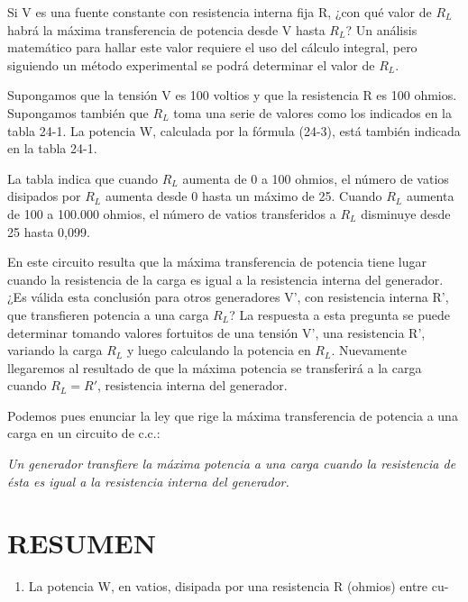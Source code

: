 \documentclass{article}
\begin{document}
Si V es una fuente constante con resistencia interna fija R, ¿con qué valor de $R_L$ habrá la máxima transferencia de potencia desde V hasta $R_L$? Un análisis matemático para hallar este valor requiere el uso del cálculo integral, pero siguiendo un método experimental se podrá determinar el valor de $R_L$.

Supongamos que la tensión V es 100 voltios y que la resistencia R es 100 ohmios. Supongamos también que $R_L$ toma una serie de valores como los indicados en la tabla 24-1. La potencia W, calculada por la fórmula (24-3), está también indicada en la tabla 24-1.

La tabla indica que cuando $R_L$ aumenta de 0 a 100 ohmios, el número de vatios disipados por $R_L$ aumenta desde 0 hasta un máximo de 25. Cuando $R_L$ aumenta de 100 a 100.000 ohmios, el número de vatios transferidos a $R_L$ disminuye desde 25 hasta 0,099.

En este circuito resulta que la máxima transferencia de potencia tiene lugar cuando la resistencia de la carga es igual a la resistencia interna del generador. ¿Es válida esta conclusión para otros generadores V', con resistencia interna R', que transfieren potencia a una carga $R_L$? La respuesta a esta pregunta se puede determinar tomando valores fortuitos de una tensión V', una resistencia R', variando la carga $R_L$ y luego calculando la potencia en $R_L$. Nuevamente llegaremos al resultado de que la máxima potencia se transferirá a la carga cuando $R_L = R'$, resistencia interna del generador.

Podemos pues enunciar la ley que rige la máxima transferencia de potencia a una carga en un circuito de c.c.:

\textit{Un generador transfiere la máxima potencia a una carga cuando la resistencia de ésta es igual a la resistencia interna del generador.}

\section*{RESUMEN}
\begin{enumerate}
    \item La potencia W, en vatios, disipada por una resistencia R (ohmios) entre cu-
\end{enumerate}
\end{document}
